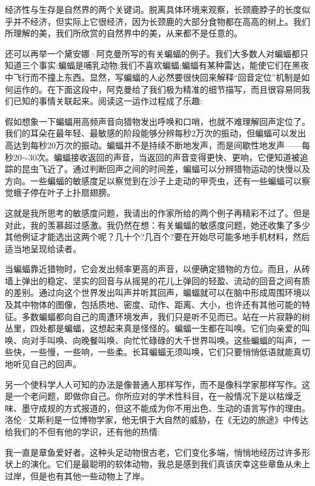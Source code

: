 经济性与生存是自然界的两个关键词。脱离具体环境来观察，长颈鹿脖子的长度似乎并不经济，但实际上它很经济，因为长颈鹿的大部分食物都在高高的树上。我们所理解的美，我们所欣赏的自然界中的美，从来都不是任意的。

还可以再举一个黛安娜·阿克曼所写的有关蝙蝠的例子。我们大多数人对蝙蝠都只知道三个事实:蝙蝠是哺乳动物;我们不喜欢蝙蝠;蝙蝠有某种雷达，能使它们在黑夜中飞行而不撞上东西。显然，写蝙蝠的人必然要很快回来解释“回音定位”机制是如何运作的。在下面这段中，阿克曼给了我们极为精准的细节描写，而且很容易同我们已知的事情关联起来。阅读这一运作过程成了乐趣:

假如想象一下蝙蝠用高频声音向猎物发出呼唤和口哨，也就不难理解回声定位了。我们的耳朵在最年轻、最敏感的阶段能够分辨每秒2万次的振动，但蝙蝠可以发出高达到每秒20万次的振动。蝙蝠并不是持续不断地发声，而是间歇性地发声——每秒20$\sim$30次。蝙蝠接收返回的声音，当返回的声音变得更快、更响，它便知道被追踪的昆虫飞近了。通过判断回声之间的时间差，蝙蝠可以分辨猎物运动的快慢以及方向。一些蝙蝠的敏感度足以察觉到在沙子上走动的甲壳虫，还有一些蝙蝠可以察觉蛾子停在叶子上扑扇翅膀。

这就是我所思考的敏感度问题，我请出的作家所给的两个例子再精彩不过了。但是对此，我的羡慕超过感激。我仍然在想：有关蝙蝠的敏感度问题，她还收集了多少其他例证才能选出这两个呢？几十个?几百个?要在开始尽可能多地手机材料，然后适当地呈现给读者。

当蝙蝠靠近猎物时，它会发出频率更高的声音，以便确定猎物的方位。而且，从砖墙上弹出的稳定、坚实的回音与从摇晃的花儿上弹回的轻盈、流动的回音之间有质的差别。通过向这个世界发出叫声并听其回声，蝙蝠就可以在脑中形成周围环境以及其中物体的图像，包括质地、密度、动作、距离、大小，也许还有其他可能的特征。多数蝙蝠都向自己的周遭环境发声，我们只是听不见而已。站在一片寂静的树丛里，四处都是蝙蝠，这想起来真是怪怪的。蝙蝠一生都在叫唤。它们向亲爱的叫唤、向对手叫唤、向晚餐叫唤、向忙忙碌碌的大千世界叫唤。这些蝙蝠的叫声，一些快，一些慢，一些响，一些柔。长耳蝙蝠无须叫唤，它们只要悄悄低语就能真切地听见自己的回声。

另一个使科学人人可知的办法是像普通人那样写作，而不是像科学家那样写作。这是一个老问题，即做你自己。你所应对的学术性科目，在一般情况下是以枯燥乏味、墨守成规的方式报道的，但这不能成为你不用出色、生动的语言写作的理由。洛伦·艾斯利是一位博物学家，他无惧于大自然的威胁，在《无边的旅途》中传达给我们的不但有他的学识，还有他的热情:

我一直是章鱼爱好者。这种头足动物很古老，它们变化多端，悄悄地经历过许多形状上的演化。它们是最聪明的软体动物，我总是感到我们真该庆幸这些章鱼从未上过岸，但是也有其他一些动物上了岸。

